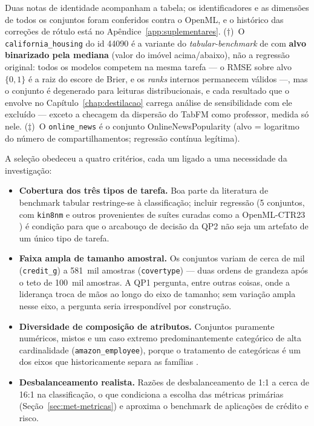 Duas notas de identidade acompanham a tabela; os identificadores e as
dimensões de todos os conjuntos foram conferidos contra o OpenML, e o
histórico das correções de rótulo está no
Apêndice~\ref{app:suplementares}. ($\dagger$)~O
\texttt{california\_\allowbreak housing} do id 44090 é a variante do
\emph{tabular-benchmark} de \citet{grinsztajn2022} com \textbf{alvo
binarizado pela mediana} (valor do imóvel acima/abaixo), não a
regressão original: todos os modelos competem na mesma tarefa --- o
RMSE sobre alvo $\{0,1\}$ é a raiz do escore de Brier, e os
\emph{ranks} internos permanecem válidos ---, mas o conjunto é
degenerado para leituras distribucionais, e cada resultado que o
envolve no Capítulo~\ref{chap:destilacao} carrega análise de
sensibilidade com ele excluído --- exceto a checagem da dispersão do
TabFM como professor, medida só nele. ($\ddagger$)~O
\texttt{online\_news} é o conjunto OnlineNewsPopularity (alvo =
logaritmo do número de compartilhamentos; regressão contínua
legítima).

A seleção obedeceu a quatro critérios, cada um ligado a uma necessidade da
investigação:

\begin{itemize}
  \item \textbf{Cobertura dos três tipos de tarefa.} Boa parte da literatura
    de benchmark tabular restringe-se à classificação; incluir regressão (5
    conjuntos, com \texttt{kin8nm} e outros provenientes de suítes curadas
    como a OpenML-CTR23 \citep{fischer2023}) é condição para que o arcabouço
    de decisão da QP2 não seja um artefato de um único tipo de tarefa.
  \item \textbf{Faixa ampla de tamanho amostral.} Os conjuntos
    variam de cerca de mil (\texttt{credit\_g}) a 581~mil amostras
    (\texttt{covertype}) --- duas ordens de grandeza após o teto de
    100~mil amostras. A QP1 pergunta, entre outras coisas, onde a liderança troca de mãos ao
    longo do eixo de tamanho; sem variação ampla nesse eixo, a pergunta seria
    irrespondível por construção.
  \item \textbf{Diversidade de composição de atributos.} Conjuntos puramente
    numéricos, mistos e um caso extremo predominantemente categórico de alta
    cardinalidade (\texttt{amazon\_\allowbreak employee}), porque o tratamento de
    categóricas é um dos eixos que historicamente separa as famílias
    \citep{grinsztajn2022, mcelfresh2023}.
  \item \textbf{Desbalanceamento realista.} Razões de desbalanceamento de
    1:1 a cerca de 16:1 na classificação, o que condiciona a escolha das
    métricas primárias (Seção~\ref{sec:met-metricas}) e aproxima o benchmark
    de aplicações de crédito e risco.
\end{itemize}

